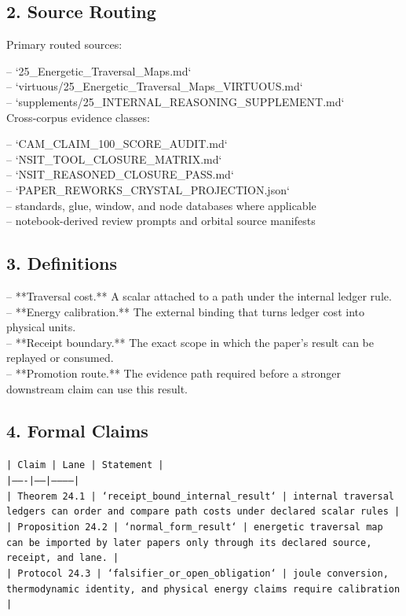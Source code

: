 \documentclass[11pt]{article}
\begin{document}
\subsection*{2. Source Routing}

Primary routed sources:

\noindent{}-- `25\_Energetic\_Traversal\_Maps.md`\\
\noindent{}-- `virtuous/25\_Energetic\_Traversal\_Maps\_VIRTUOUS.md`\\
\noindent{}-- `supplements/25\_INTERNAL\_REASONING\_SUPPLEMENT.md`\\

Cross-corpus evidence classes:

\noindent{}-- `CAM\_CLAIM\_100\_SCORE\_AUDIT.md`\\
\noindent{}-- `NSIT\_TOOL\_CLOSURE\_MATRIX.md`\\
\noindent{}-- `NSIT\_REASONED\_CLOSURE\_PASS.md`\\
\noindent{}-- `PAPER\_REWORKS\_CRYSTAL\_PROJECTION.json`\\
\noindent{}-- standards, glue, window, and node databases where applicable\\
\noindent{}-- notebook-derived review prompts and orbital source manifests\\

\subsection*{3. Definitions}

\noindent{}-- **Traversal cost.** A scalar attached to a path under the internal ledger rule.\\
\noindent{}-- **Energy calibration.** The external binding that turns ledger cost into physical units.\\
\noindent{}-- **Receipt boundary.** The exact scope in which the paper's result can be replayed or consumed.\\
\noindent{}-- **Promotion route.** The evidence path required before a stronger downstream claim can use this result.\\

\subsection*{4. Formal Claims}

\noindent\texttt{| Claim | Lane | Statement |}\\
\noindent\texttt{|-------|------|-----------|}\\
\noindent\texttt{| Theorem 24.1 | `receipt\_bound\_internal\_result` | internal traversal ledgers can order and compare path costs under declared scalar rules |}\\
\noindent\texttt{| Proposition 24.2 | `normal\_form\_result` | energetic traversal map can be imported by later papers only through its declared source, receipt, and lane. |}\\
\noindent\texttt{| Protocol 24.3 | `falsifier\_or\_open\_obligation` | joule conversion, thermodynamic identity, and physical energy claims require calibration |}\\
\end{document}
